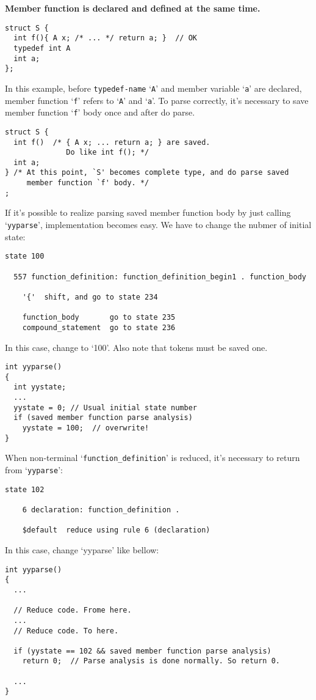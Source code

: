 \documentclass{article}
\begin{document}
\large
{\bf{Member function is declared and defined at the same time.}}
\normalsize

\begin{verbatim}
struct S {
  int f(){ A x; /* ... */ return a; }  // OK
  typedef int A
  int a;
};
\end{verbatim}
In this example,
before {\tt{typedef-name}} `{\tt{A}}' and member variable `{\tt{a}}'
are declared, member function `{\tt{f}}' refers to `{\tt{A}}' and
`{\tt{a}}'. To parse correctly, it's necessary to save member
function `{\tt{f}}' body once and after do parse.

\begin{verbatim}
struct S {
  int f()  /* { A x; ... return a; } are saved.
              Do like int f(); */
  int a;
} /* At this point, `S' becomes complete type, and do parse saved
     member function `f' body. */
;
\end{verbatim}
If it's possible to realize parsing saved member function body
by just calling `{\tt{yyparse}}', implementation becomes easy.
We have to change the nubmer
of initial state:
\begin{verbatim}
state 100

  557 function_definition: function_definition_begin1 . function_body

    '{'  shift, and go to state 234

    function_body       go to state 235
    compound_statement  go to state 236
\end{verbatim}
In this case, change to `100'. Also note that tokens must be
saved one.
\begin{verbatim}
int yyparse()
{
  int yystate;
  ...
  yystate = 0; // Usual initial state number
  if (saved member function parse analysis)
    yystate = 100;  // overwrite!
}
\end{verbatim}
When non-terminal `{\tt{function\_definition}}' is reduced,
it's necessary to return from `{\tt{yyparse}}':
\begin{verbatim}
state 102

    6 declaration: function_definition .

    $default  reduce using rule 6 (declaration)
\end{verbatim}
In this case, change `yyparse' like bellow:
\begin{verbatim}
int yyparse()
{
  ...

  // Reduce code. Frome here.
  ...
  // Reduce code. To here.

  if (yystate == 102 && saved member function parse analysis)
    return 0;  // Parse analysis is done normally. So return 0.

  ...
} 
\end{verbatim}
\end{document}
